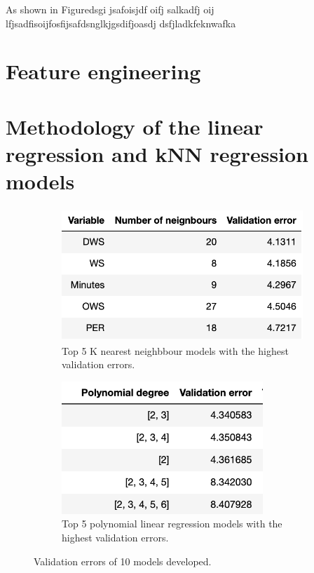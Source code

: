 \documentclass[letterpaper,12pt,twoside,]{pinp}
\begin{document}
As shown in Figuredsgi jsafoisjdf oifj salkadfj oij
lfjsadfisoijfosfijsafdsnglkjgsdifjoasdj dsfjladkfeknwafka

\hypertarget{feature-engineering}{%
\section{Feature engineering}\label{feature-engineering}}

\hypertarget{methodology-of-the-linear-regression-and-knn-regression-models}{%
\section{Methodology of the linear regression and kNN regression
models}\label{methodology-of-the-linear-regression-and-knn-regression-models}}

\begin{figure}[H]
\begin{subfigure}{0.5\textwidth}
\includegraphics[width=0.9\linewidth, height=5cm]{knn_models.png} 
\caption{Top 5 K nearest neighbbour models with the highest validation errors.}
\label{fig:subim1}
\end{subfigure}
\begin{subfigure}{0.5\textwidth}
\includegraphics[width=0.9\linewidth, height=5cm]{poly_models.png}
\caption{Top 5 polynomial linear regression models with the highest validation errors.}
\label{fig:subim2}
\end{subfigure}
\caption{Validation errors of 10 models developed.}
\end{figure}
\end{document}

